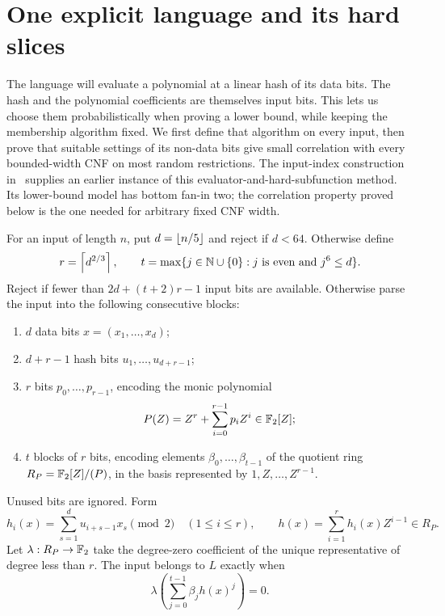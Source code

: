 \section{One explicit language and its hard slices}
\label{sec:construction}

The language will evaluate a polynomial at a linear hash of its data bits.
The hash and the polynomial coefficients are themselves input bits.  This
lets us choose them probabilistically when proving a lower bound, while
keeping the membership algorithm fixed.  We first define that algorithm on
every input, then prove that suitable settings of its non-data bits give
small correlation with every bounded-width CNF on most random restrictions.
The input-index construction in~\cite[Section~5]{PSZ00} supplies an earlier
instance of this evaluator-and-hard-subfunction method.  Its lower-bound
model has bottom fan-in two; the correlation property proved below is the
one needed for arbitrary fixed CNF width.

\begin{definition}\label{def:language}
For an input of length $n$, put $d=\left\lfloor n/5\right\rfloor$ and reject if $d<64$.
Otherwise define
\[
 r=\left\lceil d^{2/3}\right\rceil,\qquad
 t=\max\{j\in\mathbb N\cup\{0\}: j\text{ is even and }j^6\le d\}.
\]
Reject if fewer than $2d+(t+2)r-1$ input bits are available.
Otherwise parse the input into the following consecutive blocks:
\begin{enumerate}
\item $d$ data bits $x=(x_1,\ldots,x_d)$;
\item $d+r-1$ hash bits $u_1,\ldots,u_{d+r-1}$;
\item $r$ bits $p_0,\ldots,p_{r-1}$, encoding the monic polynomial
\[
 P(Z)=Z^r+\sum_{i=0}^{r-1}p_iZ^i\in\mathbb F_2[Z];
\]
\item $t$ blocks of $r$ bits, encoding elements $\beta_0,\ldots,\beta_{t-1}$ of
the quotient ring $R_P=\mathbb F_2[Z]/(P)$, in the basis represented by
$1,Z,\ldots,Z^{r-1}$.
\end{enumerate}
Unused bits are ignored.  Form
\begin{equation}\label{eq:toeplitz-hash}
 h_i(x)=\sum_{s=1}^d u_{i+s-1}x_s\pmod2
 \quad(1\le i\le r),\qquad
 h(x)=\sum_{i=1}^r h_i(x)Z^{i-1}\in R_P.
\end{equation}
Let $\lambda:R_P\to\mathbb F_2$ take the degree-zero coefficient of the unique
representative of degree less than $r$.  The input belongs to $L$ exactly
when
\begin{equation}\label{eq:language-evaluation}
 \lambda\left(\sum_{j=0}^{t-1}\beta_jh(x)^j\right)=0.
\end{equation}
\end{definition}


